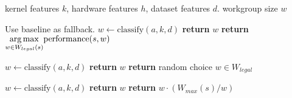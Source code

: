 \begin{algorithmic}[1]
\Require kernel features $k$, hardware features $h$, dataset features
$d$.
\Ensure workgroup size $w$

\Comment Use baseline as fallback.
\State $w \leftarrow \text{classify}(a, k, d)$
    \State \textbf{return} $w$
\Else
  \State \textbf{return} $\underset{w \in W_{legal}(s)}{\operatorname*{arg\,max}} \text{performance}(s,w)$
\EndIf
\EndProcedure
\item[]

\State $w \leftarrow \text{classify}(a, k, d)$
    \State \textbf{return} $w$
\Else
  \State \textbf{return} random choice $w \in W_{legal}$
\EndIf
\EndProcedure
\item[]

\State $w \leftarrow \text{classify}(a, k, d)$
    \State \textbf{return} $w$
\Else
  \State \textbf{return} $w \cdot (W_{max}(s) / w)$
\EndIf
\EndProcedure
\end{algorithmic}
